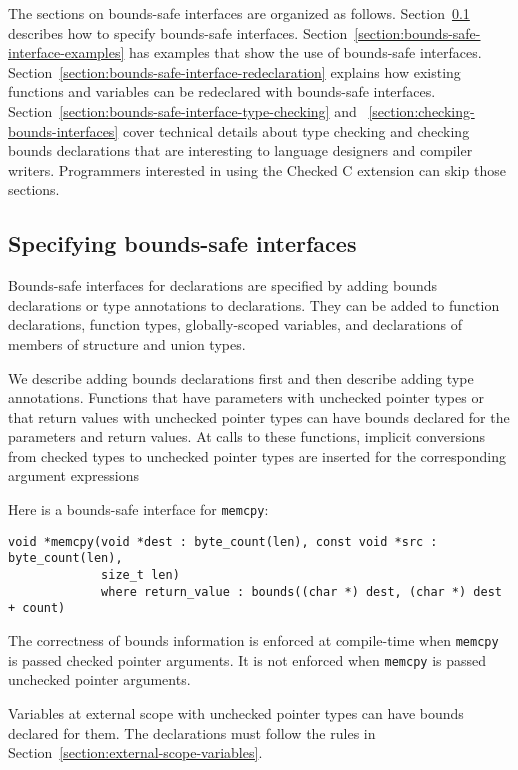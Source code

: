 The sections on bounds-safe interfaces are organized as
follows.  Section~\ref{section:bounds-safe-interface-specifying} describes
how to specify bounds-safe interfaces.
Section~\ref{section:bounds-safe-interface-examples}
has examples that show the use of bounds-safe interfaces.
Section~\ref{section:bounds-safe-interface-redeclaration} explains
how existing functions and variables can be redeclared with bounds-safe
interfaces.  Section~\ref{section:bounds-safe-interface-type-checking}
and ~\ref{section:checking-bounds-interfaces} cover technical details
about type checking and checking bounds declarations that are interesting
to language designers and compiler writers.  Programmers interested
in using the Checked C extension can skip those sections.

\subsection{Specifying bounds-safe interfaces}
\label{section:bounds-safe-interface-specifying}
Bounds-safe interfaces for declarations are specified by adding bounds
declarations or type annotations to declarations.  They can be added to
function declarations, function types, globally-scoped variables, and
declarations of members of structure and union types.

We describe adding bounds declarations first and then  describe adding type
annotations.  Functions that have parameters with unchecked pointer
types or that return values with unchecked pointer types can have bounds
declared for the parameters and return values.  At calls to
these functions, implicit conversions from checked types to unchecked
pointer types are inserted for the corresponding argument expressions
  
Here is a bounds-safe interface for \texttt{memcpy}:
\begin{verbatim}
void *memcpy(void *dest : byte_count(len), const void *src : byte_count(len), 
             size_t len) 
             where return_value : bounds((char *) dest, (char *) dest + count)
\end{verbatim}
The correctness of bounds information is enforced at compile-time when
\texttt{memcpy} is passed checked pointer arguments. It is not enforced when 
\texttt{memcpy} is passed unchecked pointer arguments.

Variables at external scope with unchecked pointer types can have
bounds declared for them.   The declarations must follow the 
rules in Section~\ref{section:external-scope-variables}.

